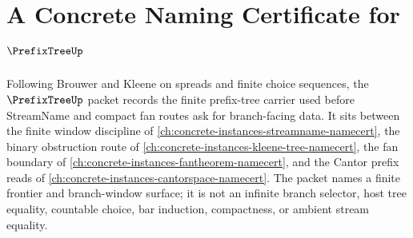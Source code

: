 \chapter{A Concrete Naming Certificate for $\PrefixTreeUp$}
\label{ch:concrete-instances-prefix-tree-namecert}

Following Brouwer and Kleene on spreads and finite choice sequences, the $\PrefixTreeUp$ packet records the finite prefix-tree carrier used before StreamName and compact fan routes ask for branch-facing data. It sits between the finite window discipline of \autoref{ch:concrete-instances-streamname-namecert}, the binary obstruction route of \autoref{ch:concrete-instances-kleene-tree-namecert}, the fan boundary of \autoref{ch:concrete-instances-fantheorem-namecert}, and the Cantor prefix reads of \autoref{ch:concrete-instances-cantorspace-namecert}. The packet names a finite frontier and branch-window surface; it is not an infinite branch selector, host tree equality, countable choice, bar induction, compactness, or ambient stream equality.


